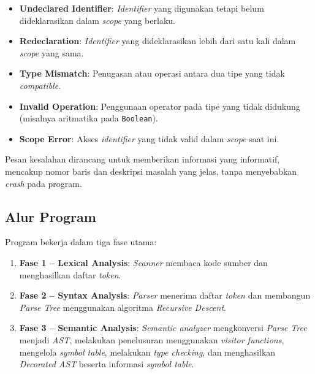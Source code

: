 ﻿\documentclass[12pt,a4paper]{article}
\begin{document}
\begin{itemize}
    \item \textbf{Undeclared Identifier}: \textit{Identifier} yang digunakan tetapi belum dideklarasikan dalam \textit{scope} yang berlaku.
    \item \textbf{Redeclaration}: \textit{Identifier} yang dideklarasikan lebih dari satu kali dalam \textit{scope} yang sama.
    \item \textbf{Type Mismatch}: Penugasan atau operasi antara dua tipe yang tidak \textit{compatible}.
    \item \textbf{Invalid Operation}: Penggunaan operator pada tipe yang tidak didukung (misalnya aritmatika pada \texttt{Boolean}).
    \item \textbf{Scope Error}: Akses \textit{identifier} yang tidak valid dalam \textit{scope} saat ini.
\end{itemize}

Pesan kesalahan dirancang untuk memberikan informasi yang informatif, mencakup nomor baris dan deskripsi masalah yang jelas, tanpa menyebabkan \textit{crash} pada program.

\subsection{Alur Program}

Program bekerja dalam tiga fase utama:

\begin{enumerate}
    \item \textbf{Fase 1 -- Lexical Analysis}: \textit{Scanner} membaca kode sumber dan menghasilkan daftar \textit{token}.
    \item \textbf{Fase 2 -- Syntax Analysis}: \textit{Parser} menerima daftar \textit{token} dan membangun \textit{Parse Tree} menggunakan algoritma \textit{Recursive Descent}.
    \item \textbf{Fase 3 -- Semantic Analysis}: \textit{Semantic analyzer} mengkonversi \textit{Parse Tree} menjadi \textit{AST}, melakukan penelusuran menggunakan \textit{visitor functions}, mengelola \textit{symbol table}, melakukan \textit{type checking}, dan menghasilkan \textit{Decorated AST} beserta informasi \textit{symbol table}.
\end{enumerate}
\end{document}
